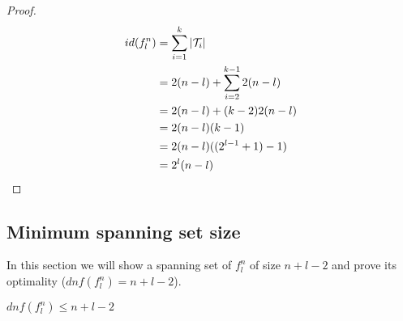 \begin{proof}
\begin{align*}
id(f_l^n) &= \sum_{i=1}^k{\lvert\mathcal{T}_i\rvert} \\
&= 2 (n-l) + \sum_{i=2}^{k-1}{2 (n-l)} \\
&= 2 (n-l) + (k-2) 2 (n-l) \\
&= 2 (n-l) (k-1) \\
&= 2 (n-l) ((2^{l-1} + 1) - 1) \\
&= 2^l (n-l)
\end{align*}
\end{proof}

\subsection{Minimum spanning set size}

In this section we will show a spanning set
of $f^n_l$ of size $n+l-2$
and prove its optimality
($dnf(f^n_l) = n+l-2$).

\begin{lemma}
\label{lemma:difficultdnfupper}
$dnf(f_l^n) \leq n+l-2$
\end{lemma}

